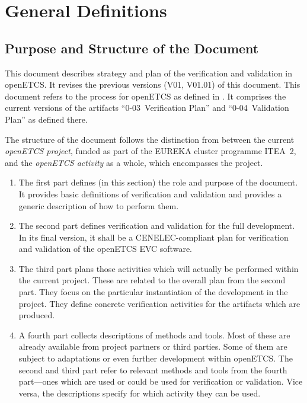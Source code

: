 \documentclass{template/openetcs_report}
\begin{document}



\mainmatter

\part{General Definitions}

\chapter{Purpose and Structure of the Document}
\label{sec:purpose}

This document describes strategy and plan of the verification and
validation in openETCS. It revises the previous versions (V01, V01.01)
of this document.  This document refers to the process for openETCS as
defined in \cite{openETCS:D2.3a-V02}. It comprises the current versions
of the artifacts ``0-03~Verification Plan'' and ``0-04~Validation
Plan'' as defined there.

The structure of the document follows the distinction from
\cite{openETCS:D2.3a-V02} between the current \emph{openETCS project},
funded as part of the EUREKA cluster programme ITEA~2, and the
\emph{openETCS activity} as a whole, which encompasses the project.


\begin{enumerate}
\item The first part defines (in this section) the role and purpose of
  the document. It provides basic definitions of verification and
  validation and provides a generic description of how to perform
  them.
\item The second part defines verification and validation for the full
  development. In its final version, it shall be a CENELEC-compliant
  plan for verification and validation of the openETCS EVC software.
\item The third part plans those activities which will actually
  be performed within the current project. These are related to
  the overall plan from the second part. They focus on the particular
  instantiation of the development in the project. They define concrete
  verification activities for the artifacts which are produced.
\item A fourth part collects descriptions of methods and tools. Most of
  these are already available from project partners or third
  parties. Some of them are subject to adaptations or even further
  development within openETCS. The second and third part refer to
  relevant methods and tools from the fourth part---ones which are used
  or could be used for verification or validation. Vice versa, the
  descriptions specify for which activity they can be used.
\end{enumerate}
  
\end{document}
